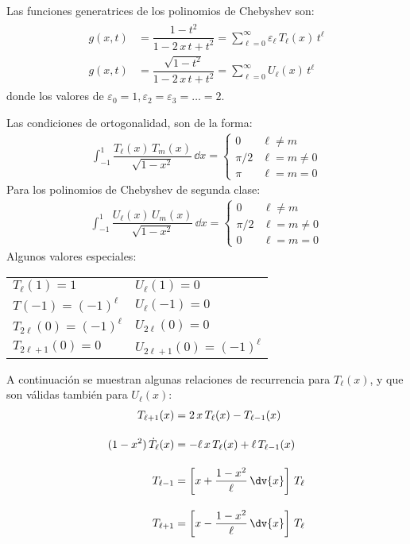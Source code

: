 Las funciones generatrices de los polinomios de Chebyshev son:
\begin{align}
\begin{aligned}
g(x, t) &= \dfrac{1 - t^{2}}{1 - 2 \, x \, t + t^{2}} = \sum_{\ell=0}^{\infty} \varepsilon_{\ell} \, T_{\ell} (x) \, t^{\ell} \\[0.5em]
g(x, t) &= \dfrac{\sqrt{1 - t^{2}}}{1 - 2 \, x \, t + t^{2}} = \sum_{\ell=0}^{\infty} U_{\ell} (x) \, t^{\ell}
\end{aligned}
\label{eq:ecuacion_08_88}
\end{align}
donde los valores de $\varepsilon_{0} = 1, \varepsilon_{2} = \varepsilon_{3} = \ldots = 2$.
\par
Las condiciones de ortogonalidad, son de la forma:
\begin{align*}
\int_{-1}^{1} \dfrac{T_{\ell} (x) \, T_{m} (x)}{\sqrt{1 - x^{2}}} \, \dd{x} = 
\begin{cases}
0 & \ell \neq m \\
\pi/2 & \ell = m \neq 0 \\
\pi & \ell = m = 0
\end{cases}
\end{align*}
Para los polinomios de Chebyshev de segunda clase:
\begin{align*}
\int_{-1}^{1} \dfrac{U_{\ell} (x) \, U_{m} (x)}{\sqrt{1 - x^{2}}} \, \dd{x} = 
\begin{cases}
0     & \ell \neq m     \\
\pi/2 & \ell = m \neq 0 \\
0   & \ell = m = 0    
\end{cases}
\end{align*}
Algunos valores especiales:
\begin{table}[H]
\centering
\begin{tabular}{>{\raggedright\arraybackslash}p{5cm} >{\raggedright\arraybackslash}p{5cm}}
$T_{\ell} (1) = 1$ & $U_{\ell}(1)=0$ \\
$T(-1) = (-1)^{\ell}$ & $U_{\ell}(-1) = 0$ \\
$T_{2 \ell}(0) = (-1)^{\ell}$ & $U_{2 \ell}(0) = 0$ \\
$T_{2 \ell+1}(0) = 0$ & $U_{2 \ell+1}(0) = (-1)^{\ell}$ \\ 
\end{tabular}
\end{table}
A continuación se muestran algunas relaciones de recurrencia para $T_{\ell}(x)$, y que son válidas también para $U_{\ell}(x)$:
\begin{align*}
T_{\ell+1}(x) &= 2 \, x \, T_{\ell} (x) - T_{\ell-1} (x) \\[1em]
(1 - x^{2}) \, \dot{T}_{\ell}(x) &= -\ell \, x \, T_{\ell}(x) + \ell \, T_{\ell-1} (x) \\[1em]
T_{\ell-1} &= \left[ x + \dfrac{1 - x^{2}}{\ell} \, \dv{x} \right] \, T_{\ell} \\[1em]
T_{\ell+1} &= \left[ x - \dfrac{1 - x^{2}}{\ell} \, \dv{x} \right] \, T_{\ell} \\[1em]
\end{align*}
